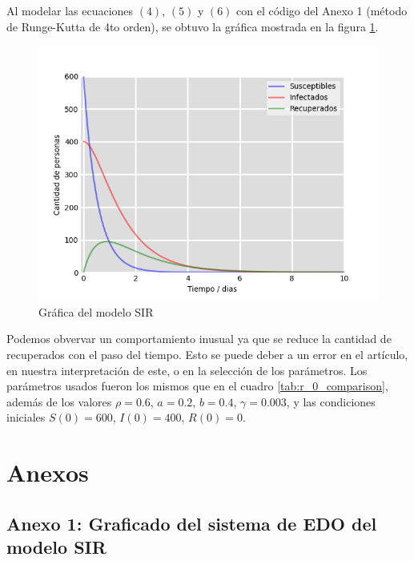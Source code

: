 \documentclass{article}
\begin{document}
Al modelar las ecuaciones $(4)$, $(5)$ y $(6)$ con el c\'odigo del Anexo 1 (m\'etodo de Runge-Kutta de 4to orden), se obtuvo la gr\'afica mostrada en la figura \ref{fig:model_graph}.

\begin{figure}[H]
    \centering
    \includegraphics[width=1\textwidth]{./images/Figure_1.png}
    \caption{Gr\'afica del modelo SIR}
    \label{fig:model_graph}
\end{figure}

Podemos obvervar un comportamiento inusual ya que se  reduce la cantidad de recuperados con el paso del tiempo. Esto se puede deber a un error en el art\'iculo, en nuestra interpretaci\'on de este, o en la selecci\'on de los par\'ametros. Los par\'ametros usados fueron los mismos que en el cuadro \ref{tab:r_0_comparison}, adem\'as de los valores $\rho=0.6$, $a=0.2$, $b=0.4$, $\gamma=0.003$, y las condiciones iniciales $S(0)=600$, $I(0)=400$, $R(0)=0$.

\section{Anexos}

\subsection*{Anexo 1: Graficado del sistema de EDO del modelo SIR}
\end{document}
